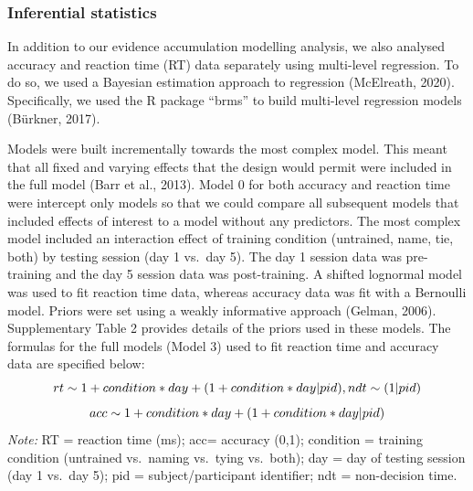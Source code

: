 \documentclass[
  english,
  man,floatsintext]{apa6}
\begin{document}
\subsubsection{Inferential statistics}\label{inferential-statistics}

In addition to our evidence accumulation modelling analysis, we also analysed accuracy and reaction time (RT) data separately using multi-level regression. To do so, we used a Bayesian estimation approach to regression (McElreath, 2020). Specifically, we used the R package ``brms'' to build multi-level regression models (Bürkner, 2017).

Models were built incrementally towards the most complex model. This meant that all fixed and varying effects that the design would permit were included in the full model (Barr et al., 2013). Model 0 for both accuracy and reaction time were intercept only models so that we could compare all subsequent models that included effects of interest to a model without any predictors. The most complex model included an interaction effect of training condition (untrained, name, tie, both) by testing session (day 1 vs.~day 5). The day 1 session data was pre-training and the day 5 session data was post-training. A shifted lognormal model was used to fit reaction time data, whereas accuracy data was fit with a Bernoulli model. Priors were set using a weakly informative approach (Gelman, 2006). Supplementary Table 2 provides details of the priors used in these models. The formulas for the full models (Model 3) used to fit reaction time and accuracy data are specified below:
\[rt \sim 1 + condition * day + \\
(1 + condition * day | pid), \\
ndt \sim (1 | pid)\]
\[acc \sim 1 + condition * day + \\
(1 + condition * day | pid)\]
\emph{Note:} RT = reaction time (ms); acc= accuracy (0,1); condition = training condition (untrained vs.~naming vs.~tying vs.~both); day = day of testing session (day 1 vs.~day 5); pid = subject/participant identifier; ndt = non-decision time.
\end{document}
